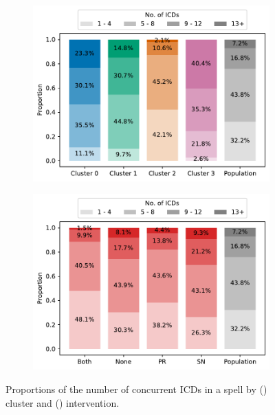 \documentclass[11pt]{article}
\newlength{\imgwidth}
\begin{document}
\begin{figure}
    \centering
    \begin{subfigure}{.5\imgwidth}
        \includegraphics[width=\linewidth]{img_cluster_icds}
        \caption{}\label{fig:cluster_icds}
    \end{subfigure}\hfill%
    \begin{subfigure}{.5\imgwidth}
        \includegraphics[width=\linewidth]{img_intervention_icds}
        \caption{}\label{fig:intervention_icds}
    \end{subfigure}
    \caption{%
        Proportions of the number of concurrent ICDs in a spell by
        () cluster and ()
        intervention.
    }\label{fig:icds}
\end{figure}
\end{document}
